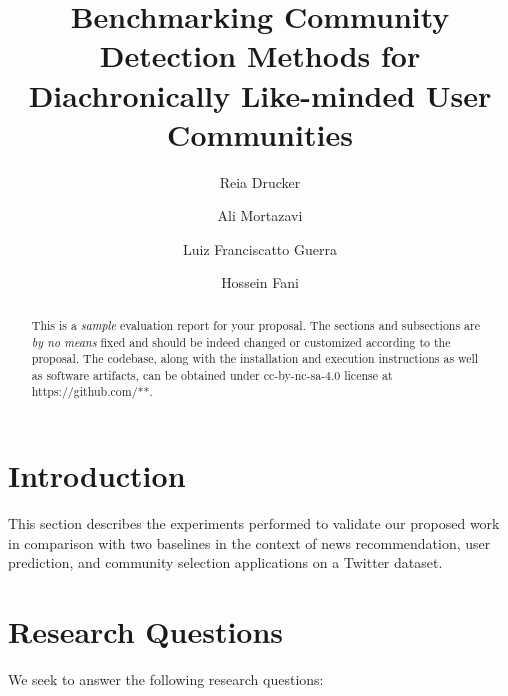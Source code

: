 \documentclass[sigconf]{acmart}
\begin{document}
\title{Benchmarking Community Detection Methods for Diachronically Like-minded User Communities}
\author{Reia Drucker}
\author{Ali Mortazavi}
\author{Luiz Franciscatto Guerra}

\author{Hossein Fani}

\begin{abstract}
{\color{blue}This is a \textit{sample} evaluation report for your proposal. The sections and subsections are \textit{by no means} fixed and should be indeed changed or customized according to the proposal. The codebase, along with the installation and execution instructions as well as software artifacts, can be obtained under cc-by-nc-sa-4.0 license at https://github.com/**.}
\end{abstract}

\maketitle
\section{Introduction}\label{experiment}
This section describes the experiments performed to validate our proposed work in comparison with two baselines in the context of news recommendation, user prediction, and community selection applications on a Twitter dataset.

\section{Research Questions}
We seek to answer the following research questions:
\end{document}
